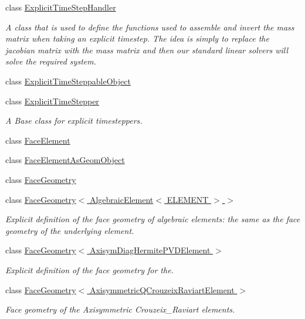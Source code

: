 \begin{DoxyCompactItemize}
class \hyperlink{classoomph_1_1ExplicitTimeStepHandler}{Explicit\+Time\+Step\+Handler}
\begin{DoxyCompactList}\small\item\em A class that is used to define the functions used to assemble and invert the mass matrix when taking an explicit timestep. The idea is simply to replace the jacobian matrix with the mass matrix and then our standard linear solvers will solve the required system. \end{DoxyCompactList}\item 
class \hyperlink{classoomph_1_1ExplicitTimeSteppableObject}{Explicit\+Time\+Steppable\+Object}
\item 
class \hyperlink{classoomph_1_1ExplicitTimeStepper}{Explicit\+Time\+Stepper}
\begin{DoxyCompactList}\small\item\em A Base class for explicit timesteppers. \end{DoxyCompactList}\item 
class \hyperlink{classoomph_1_1FaceElement}{Face\+Element}
\item 
class \hyperlink{classoomph_1_1FaceElementAsGeomObject}{Face\+Element\+As\+Geom\+Object}
\item 
class \hyperlink{classoomph_1_1FaceGeometry}{Face\+Geometry}
\item 
class \hyperlink{classoomph_1_1FaceGeometry_3_01AlgebraicElement_3_01ELEMENT_01_4_01_4}{Face\+Geometry$<$ Algebraic\+Element$<$ E\+L\+E\+M\+E\+N\+T $>$ $>$}
\begin{DoxyCompactList}\small\item\em Explicit definition of the face geometry of algebraic elements\+: the same as the face geometry of the underlying element. \end{DoxyCompactList}\item 
class \hyperlink{classoomph_1_1FaceGeometry_3_01AxisymDiagHermitePVDElement_01_4}{Face\+Geometry$<$ Axisym\+Diag\+Hermite\+P\+V\+D\+Element $>$}
\begin{DoxyCompactList}\small\item\em Explicit definition of the face geometry for the. \end{DoxyCompactList}\item 
class \hyperlink{classoomph_1_1FaceGeometry_3_01AxisymmetricQCrouzeixRaviartElement_01_4}{Face\+Geometry$<$ Axisymmetric\+Q\+Crouzeix\+Raviart\+Element $>$}
\begin{DoxyCompactList}\small\item\em Face geometry of the Axisymmetric Crouzeix\+\_\+\+Raviart elements. \end{DoxyCompactList}\item 

\end{DoxyCompactItemize}
